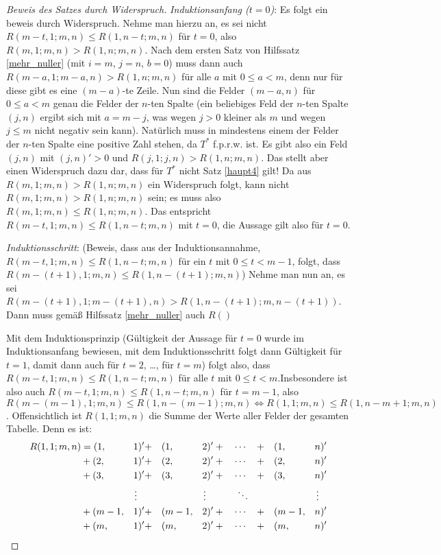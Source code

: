 \begin{proof}[Beweis des Satzes durch Widerspruch]
    \textit{Induktionsanfang ($t=0$)}: Es folgt ein beweis durch Widerspruch. Nehme man hierzu an, es sei nicht 
    $R(m-t, 1; m, n)\leq R(1, n-t; m, n)$ für $t=0$, also $R(m, 1; m, n)>R(1, n; m, n)$. Nach dem ersten Satz von 
    Hilfssatz \ref{mehr_nuller} (mit $i=m$, $j=n$, $b=0$) muss dann auch $R(m-a, 1; m-a, n) > R(1, n; m, n)$ für alle 
    $a$ mit $0\leq a<m$, denn nur für diese gibt es eine $(m-a)$-te Zeile. Nun sind die Felder $(m-a, n)$ für $0\leq 
    a<m$ genau die Felder der $n$-ten Spalte (ein beliebiges Feld der $n$-ten Spalte $(j, n)$ ergibt sich mit $a=m-j$, 
    was wegen $j>0$ kleiner als $m$ und wegen $j\leq m$ nicht negativ sein kann). Natürlich muss in mindestens einem 
    der Felder der $n$-ten Spalte eine positive Zahl stehen, da $T^*$ f.p.r.w. ist. Es gibt also ein Feld $(j, n)$ 
    mit $(j, n)'>0$ und $R(j, 1; j, n)>R(1, n; m, n)$. Das stellt aber einen Widerspruch dazu dar, dass für $T^*$ nicht 
    Satz \ref{haupt4} gilt! Da aus $R(m, 1; m, n)>R(1, n; m, n)$ ein Widerspruch folgt, kann nicht $R(m, 1; m, n)>
    R(1, n; m, n)$ sein; es muss also $R(m, 1; m, n)\leq R(1, n; m, n)$. Das entspricht $R(m-t, 1; m, n)\leq 
    R(1, n-t; m, n)$ mit $t=0$, die Aussage gilt also für $t=0$.


    \textit{Induktionsschritt}: (Beweis, dass aus der Induktionsannahme, $R(m-t, 1; m, n)\leq R(1, n-t; m, n)$ für 
    ein $t$ mit $0\leq t<m-1$, folgt, dass $R(m-(t+1), 1; m, n)\leq R(1, n-(t+1); m, n)$) Nehme man nun an, es sei 
    $R(m-(t+1), 1; m-(t+1), n)>R(1, n-(t+1); m, n-(t+1))$. Dann muss gemäß Hilfssatz \ref{mehr_nuller} auch 
    $R()$




    Mit dem Induktionsprinzip (Gültigkeit der Aussage für $t=0$ wurde im Induktionsanfang bewiesen, mit dem 
    Induktionsschritt folgt dann Gültigkeit für $t=1$, damit dann auch für $t=2$, \dots, für $t=m$) folgt also, dass 
    $R(m-t, 1; m, n)\leq R(1, n-t; m, n)$ für alle $t$ mit $0\leq t<m$.Insbesondere ist also auch $R(m-t, 1; m, n)
    \leq R(1, n-t; m, n)$ für $t=m-1$, also $R(m-(m-1), 1; m, n)\leq R(1, n-(m-1); m, n)\Leftrightarrow R(1, 1; 
    m, n)\leq R(1, n-m+1; m, n)$. Offensichtlich ist $R(1, 1; m, n)$ die Summe der Werte aller Felder der gesamten 
    Tabelle. Denn es ist:
    \begin{alignat*}{6}
        R(1, 1; m, n) &= (1, &&1)' + &&(1, &&2)' + \quad \cdots \quad + &&(1, &&n)'\\
        &+(2, &&1)' + &&(2, &&2)' +\quad \cdots \quad + &&(2, &&n)'\\
        &+(3, &&1)' + &&(3, &&2)' +\quad \cdots \quad + &&(3, &&n)'\\
        & &&\vdotswithin{1} && &&\vdotswithin{2}\quad\quad\quad \ddots && &&\vdotswithin{n} \\
        &+(m-1, &&1)' + &&(m-1, &&2)' +\quad \cdots \quad + &&(m-1, &&n)'\\
        &+(m, &&1)' + &&(m, &&2)' + \quad \cdots \quad + &&(m, &&n)'
    \end{alignat*}
    \renewcommand{\qedsymbol}{$\blacksquare$}
\end{proof}